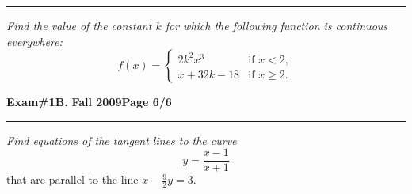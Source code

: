 \documentclass[12pt]{article}
\begin{document}
\vspace{3cm}
\hrule

{\problem[10 pts] \em Find the value of the constant $k$ for which the
  following function is continuous everywhere:} 
\begin{equation*}
f(x) = \begin{cases}
2k^2x^3 &\text{if }x<2, \\
x+32k-18 &\text{if }x \geq 2.
\end{cases}
\end{equation*}
\vspace{5cm}
\begin{flushright}
\end{flushright}

\newpage


\hfill{\large\bf Exam\#1B.}\hfill{\large\bf
  Fall 2009}\hfill{\large\bf Page 6/6}\hrule

\bigskip
{\problem[20 pts] \em Find equations of the tangent lines to the curve}
\begin{equation*}
  y = \frac{x-1}{x+1}
\end{equation*}
that are parallel to the line $x-\tfrac{9}{2} y=3$.
\end{document}
